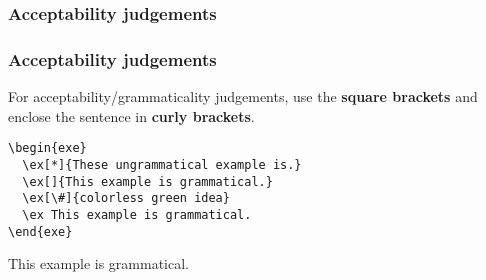 \subsubsection{Acceptability judgements}
\begin{frame}[fragile]

\frametitle{Acceptability judgements}

For acceptability/grammaticality judgements, use the \textbf{square brackets} and enclose the sentence in \textbf{curly brackets}.

\begin{lstlisting}
\begin{exe}
  \ex[*]{These ungrammatical example is.}
  \ex[]{This example is grammatical.}	
  \ex[\#]{colorless green idea}
  \ex This example is grammatical.
\end{exe}
\end{lstlisting}

\begin{exe}
	\ex This example is grammatical.
\end{exe}

\end{frame}


